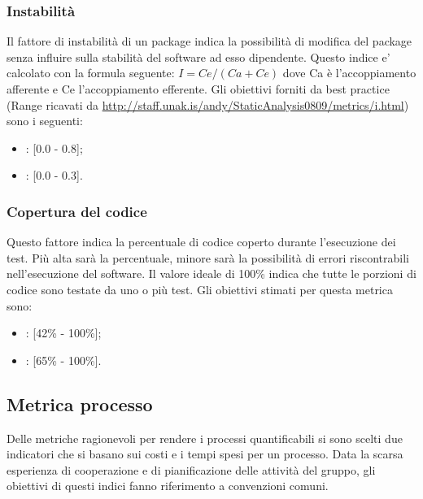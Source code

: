 \subsubsection{Instabilità}
\label{4.2.8}
Il fattore di instabilità di un package indica la possibilità di modifica del package senza influire sulla stabilità del software ad esso dipendente.
Questo indice e’ calcolato con la formula seguente:
\begin{math} I = Ce / (Ca + Ce)\end{math}
dove Ca è l'accoppiamento afferente e Ce l'accoppiamento efferente.
Gli obiettivi forniti da best practice (Range ricavati da \url{http://staff.unak.is/andy/StaticAnalysis0809/metrics/i.html}) sono i seguenti:
\begin{itemize}
\item {}: [0.0 - 0.8];
\item {}: [0.0 - 0.3].
\end{itemize}

\subsubsection{Copertura del codice}
\label{4.2.9}
Questo fattore indica la percentuale di codice coperto durante l'esecuzione dei test. Più alta sarà la percentuale, minore sarà la possibilità di errori riscontrabili nell'esecuzione del software. Il valore ideale di 100\% indica che tutte le porzioni di codice sono testate da uno o più test.
Gli obiettivi stimati per questa metrica sono:
\begin{itemize}
\item {}: [42\% - 100\%];
\item {}: [65\% - 100\%].
\end{itemize}


\subsection{Metrica processo} %
\label{4.3}
Delle metriche ragionevoli per rendere i processi quantificabili si sono scelti due indicatori che si basano sui costi e i tempi spesi per un processo. Data la scarsa esperienza di cooperazione e di pianificazione delle attività del gruppo, gli obiettivi di questi indici fanno riferimento a convenzioni comuni.

